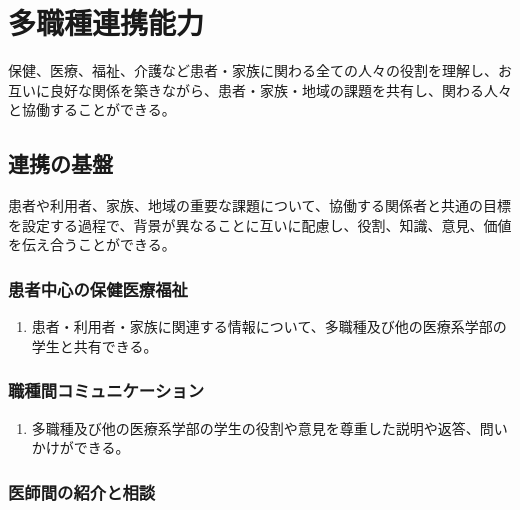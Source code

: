 \hypertarget{ux591aux8077ux7a2eux9023ux643aux80fdux529b}{%
\section{多職種連携能力}\label{ux591aux8077ux7a2eux9023ux643aux80fdux529b}}

保健、医療、福祉、介護など患者・家族に関わる全ての人々の役割を理解し、お互いに良好な関係を築きながら、患者・家族・地域の課題を共有し、関わる人々と協働することができる。

\hypertarget{ux9023ux643aux306eux57faux76e4}{%
\subsection{連携の基盤}\label{ux9023ux643aux306eux57faux76e4}}

患者や利用者、家族、地域の重要な課題について、協働する関係者と共通の目標を設定する過程で、背景が異なることに互いに配慮し、役割、知識、意見、価値を伝え合うことができる。

\hypertarget{ux60a3ux8005ux4e2dux5fc3ux306eux4fddux5065ux533bux7642ux798fux7949}{%
\subsubsection{患者中心の保健医療福祉}\label{ux60a3ux8005ux4e2dux5fc3ux306eux4fddux5065ux533bux7642ux798fux7949}}

\begin{enumerate}
\def\labelenumi{\arabic{enumi}.}
\tightlist
\item
  患者・利用者・家族に関連する情報について、多職種及び他の医療系学部の学生と共有できる。
\end{enumerate}

\hypertarget{ux8077ux7a2eux9593ux30b3ux30dfux30e5ux30cbux30b1ux30fcux30b7ux30e7ux30f3}{%
\subsubsection{職種間コミュニケーション}\label{ux8077ux7a2eux9593ux30b3ux30dfux30e5ux30cbux30b1ux30fcux30b7ux30e7ux30f3}}

\begin{enumerate}
\def\labelenumi{\arabic{enumi}.}
\tightlist
\item
  多職種及び他の医療系学部の学生の役割や意見を尊重した説明や返答、問いかけができる。
\end{enumerate}

\hypertarget{ux533bux5e2bux9593ux306eux7d39ux4ecbux3068ux76f8ux8ac7}{%
\subsubsection{医師間の紹介と相談}\label{ux533bux5e2bux9593ux306eux7d39ux4ecbux3068ux76f8ux8ac7}}

